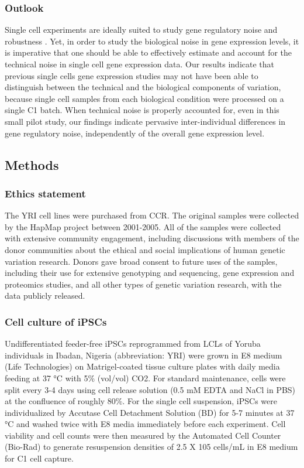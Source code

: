 \subsubsection{Outlook}\label{outlook}

Single cell experiments are ideally suited to study gene regulatory
noise and robustness \citep{Borel2015, Finak2015}. Yet, in order to
study the biological noise in gene expression levels, it is imperative
that one should be able to effectively estimate and account for the
technical noise in single cell gene expression data. Our results
indicate that previous single cells gene expression studies may not have
been able to distinguish between the technical and the biological
components of variation, because single cell samples from each
biological condition were processed on a single C1 batch. When technical
noise is properly accounted for, even in this small pilot study, our
findings indicate pervasive inter-individual differences in gene
regulatory noise, independently of the overall gene expression level.

\subsection{Methods}\label{methods}

\subsubsection{Ethics statement}\label{ethics-statement}

The YRI cell lines were purchased from CCR. The original samples were
collected by the HapMap project between 2001-2005. All of the samples
were collected with extensive community engagement, including
discussions with members of the donor communities about the ethical and
social implications of human genetic variation research. Donors gave
broad consent to future uses of the samples, including their use for
extensive genotyping and sequencing, gene expression and proteomics
studies, and all other types of genetic variation research, with the
data publicly released.

\subsubsection{Cell culture of iPSCs}\label{cell-culture-of-ipscs}

Undifferentiated feeder-free iPSCs reprogrammed from LCLs of Yoruba
individuals in Ibadan, Nigeria (abbreviation: YRI)
\citep{HapMapConsortium2005} were grown in E8 medium (Life Technologies)
\citep{Chen2011} on Matrigel-coated tissue culture plates with daily
media feeding at 37 °C with 5\% (vol/vol) CO2. For standard maintenance,
cells were split every 3-4 days using cell release solution (0.5 mM EDTA
and NaCl in PBS) at the confluence of roughly 80\%. For the single cell
suspension, iPSCs were individualized by Accutase Cell Detachment
Solution (BD) for 5-7 minutes at 37 °C and washed twice with E8 media
immediately before each experiment. Cell viability and cell counts were
then measured by the Automated Cell Counter (Bio-Rad) to generate
resuspension densities of 2.5 X 105 cells/mL in E8 medium for C1 cell
capture.


